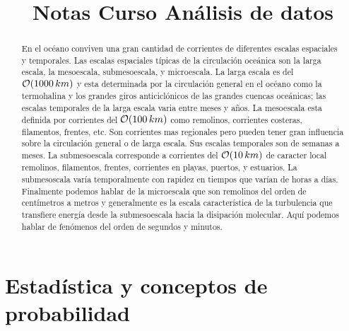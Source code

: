 \documentclass[
]{agujournal2019}
\begin{document}
\title{Notas Curso Análisis de datos}




\begin{abstract}
En el océano conviven una gran cantidad de corrientes de diferentes
escalas espaciales y temporales. Las escalas espaciales típicas de la
circulación oceánica son la larga escala, la mesoescala, submesoescala,
y microescala. La larga escala es del \({\cal O}(1000\,km)\) y esta
determinada por la circulación general en el océano como la termohalina
y los grandes giros anticiclónicos de las grandes cuencas oceánicas; las
escalas temporales de la larga escala varia entre meses y años. La
mesoescala esta definida por corrientes del \({\cal O}(100\,km)\) como
remolinos, corrientes costeras, filamentos, frentes, etc. Son corrientes
mas regionales pero pueden tener gran influencia sobre la circulación
general o de larga escala. Sus escalas temporales son de semanas a
meses. La submesoescala corresponde a corrientes del
\({\cal O}(10\,km)\) de caracter local remolinos, filamentos, frentes,
corrientes en playas, puertos, y estuarios. La submesoscala varía
temporalmente con rapidez en tiempos que varían de horas a días.
Finalmente podemos hablar de la microescala que son remolinos del orden
de centímetros a metros y generalmente es la escala característica de la
turbulencia que transfiere energía desde la submesoescala hacia la
disipación molecular. Aquí podemos hablar de fenómenos del orden de
segundos y minutos.
\end{abstract}



\ifdefined\Shaded\renewenvironment{Shaded}{\begin{tcolorbox}[breakable, interior hidden, sharp corners, borderline west={3pt}{0pt}{shadecolor}, frame hidden, boxrule=0pt, enhanced]}{\end{tcolorbox}}\fi



\hypertarget{estaduxedstica-y-conceptos-de-probabilidad}{%
\section{Estadística y conceptos de
probabilidad}\label{estaduxedstica-y-conceptos-de-probabilidad}}
\end{document}
